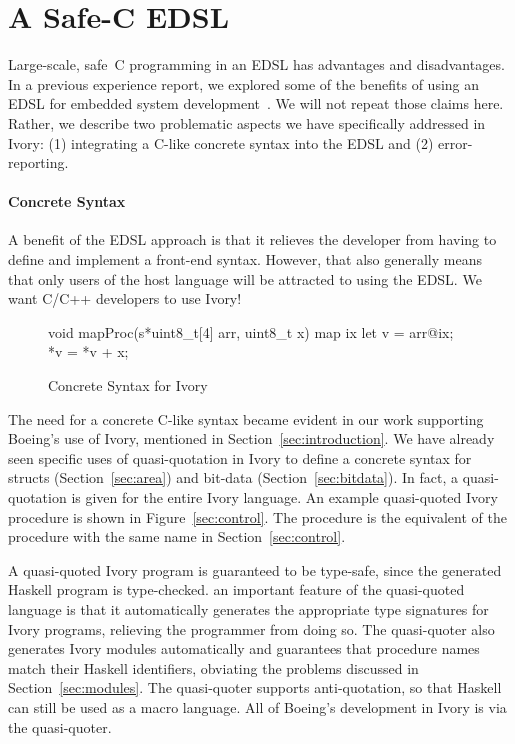 \section{A Safe-C EDSL}
\label{sec:edsl}

Large-scale, safe~C programming in an EDSL has advantages and disadvantages. In
a previous experience report, we explored some of the benefits of using an EDSL
for embedded system development~\cite{smaccm}. We will not repeat those claims
here. Rather, we describe two problematic aspects we have specifically addressed in Ivory:
(1) integrating a C-like concrete syntax into the EDSL and (2) error-reporting.

\paragraph{Concrete Syntax}

A benefit of the EDSL approach is that it relieves the developer from having to
define and implement a front-end syntax. However, that also generally means that
only users of the host language will be attracted to using the
EDSL. We want C/C++ developers to use Ivory!

\begin{figure}[h!]
\begin{code}
void mapProc(s*uint8_t[4] arr, uint8_t x) {
  map ix {
    let v = arr@ix;
    *v = *v + x;
  }
}
\end{code}
  \caption{Concrete Syntax for Ivory}
  \label{fig:concrete}
\end{figure}

The need for a concrete C-like syntax became evident in our work supporting
Boeing's use of Ivory, mentioned in Section~\ref{sec:introduction}. We have
already seen specific uses of quasi-quotation in Ivory to define a concrete
syntax for structs (Section~\ref{sec:area}) and bit-data
(Section~\ref{sec:bitdata}). In fact, a quasi-quotation is given for the entire
Ivory language. An example quasi-quoted Ivory procedure is shown in
Figure~\ref{sec:control}. The procedure is the equivalent of the procedure with
the same name in Section~\ref{sec:control}.

A quasi-quoted Ivory program is guaranteed to be type-safe, since the generated
Haskell program is type-checked. an important feature of the quasi-quoted
language is that it automatically generates the appropriate type signatures for
Ivory programs, relieving the programmer from doing so. The quasi-quoter also
generates Ivory modules automatically and guarantees that procedure names match
their Haskell identifiers, obviating the problems discussed in
Section~\ref{sec:modules}. The quasi-quoter supports anti-quotation, so that
Haskell can still be used as a macro language. All of Boeing's development in
Ivory is via the quasi-quoter.

